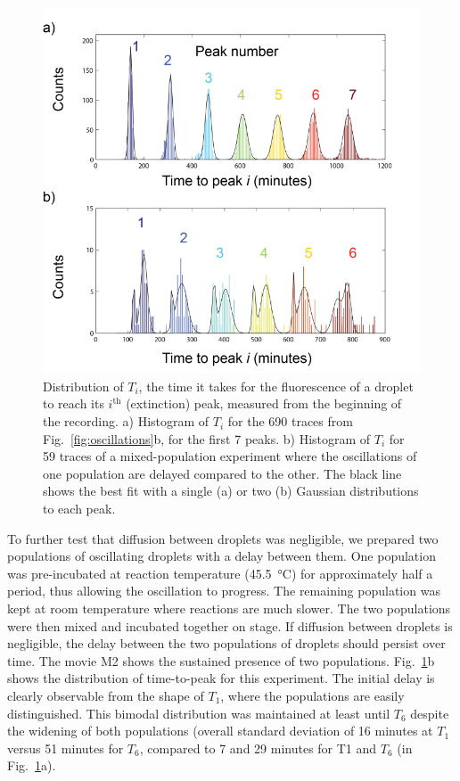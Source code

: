 \documentclass[prl,reprint, amsmath,amssymb,superscriptaddress]{revtex4-1}
\begin{document}
\begin{figure}
\includegraphics{peaks}
\caption{Distribution of  $T_i$, the time it takes for the fluorescence of a droplet to reach its $i^\text{th}$  (extinction)  peak, measured from the beginning of the recording. a) Histogram of $T_i$ for the 690 traces from Fig.~\ref{fig:oscillations}b, for the first 7 peaks. b) Histogram of $T_i$ for 59 traces of a mixed-population experiment where the oscillations of one population are delayed compared to the other. The black line shows the best fit with a single (a) or two (b) Gaussian distributions to each peak.}
\label{fig:peaks}
\end{figure}

To further test that diffusion between droplets was negligible, we prepared two populations of oscillating droplets with a delay between them. One population was pre-incubated at reaction temperature (\SI{45.5}{\celsius}) for approximately half a period, thus allowing the oscillation to progress. The remaining population was kept at room temperature where reactions are much slower. The two populations were then mixed and incubated together on stage. If diffusion between droplets is negligible, the delay between the two populations of droplets should persist over time. The movie M2 shows the sustained presence of two populations. Fig.~\ref{fig:peaks}b shows the distribution of time-to-peak for this experiment. The initial delay is clearly observable from the shape of $T_1$, where the populations are easily distinguished. This bimodal distribution was maintained at least until $T_6$ despite the widening of both populations (overall standard deviation of 16 minutes at $T_1$ versus 51 minutes for $T_6$, compared to 7 and 29 minutes for T1 and $T_6$ (in Fig.~\ref{fig:peaks}a).
\end{document}
